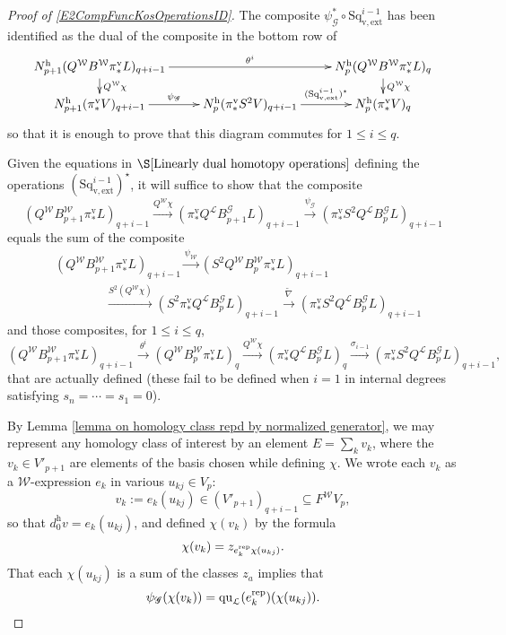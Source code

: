 \documentclass[11pt]{amsart} \renewcommand{\baselinestretch}{1.2}
\theoremstyle{plain}
\theoremstyle{definition}
\renewcommand{\to}{\longrightarrow}
\newcommand{\from}{\longleftarrow}
\newcommand{\scrG}{\mathscr{G}}
\newcommand{\calL}{\mathcal{L}}
\newcommand{\calw}{\mathcal{W}}
\newcommand{\call}{\mathcal{L}}
\newcommand{\BSW}{{\scrG}}
\newcommand{\BSWres}{B^\BSW}%
\newcommand{\quadratic}{\mathrm{qu}}
\newcommand{\vExtCohOp}{\mathrm{Sq}_\mathrm{v,ext}}
\newcommand{\uver}{^\mathrm{v}}
\newcommand{\uhor}{^\mathrm{h}}
\begin{document}
\begin{Operations in composite functor spectral sequences}
\begin{proof}[Proof of \ref{E2CompFuncKosOperationsID}]
The composite $\psi_\BSW^*\circ\vExtCohOp^{i-1}$ has been identified as the dual of the composite in the bottom row of
\[\xymatrix@R=4mm{
N\uhor_{p+1}(Q^{\calw}B^{\calw}\pi\uver_*L)_{q+i-1}\ar[rr]^-{\theta^i}
\ar[d]^-{Q^{\calw}\chi}
&%
&%
N\uhor_p(Q^{\calw}B^{\calw}\pi\uver_*L)_q\ar[d]^-{Q^{\calw}\chi}
\\%
N\uhor_{p+1}(\pi\uver_*V)_{q+i-1}\ar[r]^-{\psi_\BSW}
&%
N\uhor_{p}(\pi\uver_*S^2V)_{q+i-1}\ar[r]^-{(\vExtCohOp^{i-1})^\star}
&%
N\uhor_p(\pi\uver_*V)_q%
}\]
so that it is enough to prove that this diagram commutes for $1\leq i\leq q$.

Given the equations in $\S\ref{Linearly dual homotopy operations}$ defining the operations $(\vExtCohOp^{i-1})^\star$, it will suffice to show that the composite
\[(Q^{\calw}B^{\calw}_{p+1}\pi\uver_*L)_{q+i-1}\overset{Q^{\calw}\chi}{\to}(\pi\uver_*Q^{\calL}\BSWres_{p+1}L)_{q+i-1}\overset{\psi_\BSW}{\to}(\pi\uver_*S^2Q^{\calL}\BSWres_pL)_{q+i-1}\]
equals the sum of the composite
\[\begin{split}
&(Q^{\calw}B^{\calw}_{p+1}\pi\uver_* L)_{q+i-1}\overset{\psi_{\calw}}{\to}(S^2Q^{\calw}B^{\calw}_{p}\pi\uver_* L)_{q+i-1}\\
 &\qquad\qquad \overset{S^2(Q^{\calw}\chi)}{\to}
(S^2\pi\uver_*Q^{\call}\BSWres_pL)_{q+i-1}\overset{\widetilde{\nabla}}{\to}
(\pi\uver_*S^2Q^{\calL}\BSWres_{p}L)_{q+i-1}
\end{split}\]
and those composites, for $1\leq i \leq q$,
\[(Q^{\calw}B^{\calw}_{p+1}\pi\uver_* L)_{q+i-1}\overset{\theta^i}{\to} (Q^{\calw}B^{\calw}_{p}\pi\uver_* L)_q\overset{Q^{\calw}\chi}{\to} (\pi\uver_*Q^{\call}\BSWres_{p}L)_q\overset{\sigma_{i-1}}{\to} (\pi\uver_*S^2Q^{\calL}\BSWres_{p}L)_{q+i-1},\]
that are actually defined (these fail to be defined when $i=1$ in internal degrees satisfying $s_n=\cdots =s_1=0$). 


By Lemma \ref{lemma on homology class repd by normalized generator}, we may represent any homology class of interest by an element $E=\sum_kv_k$, where the $v_k\in V'_{p+1}$ are elements of the basis chosen while defining $\chi$. We wrote each $v_k$ as a $\calw$-expression $e_k$ in various $u_{kj}\in V_{p}$:
\[v_k:=e_{k}(u_{kj})\in (V'_{p+1})_{q+i-1}\subseteq F^{\calw}V_p,\]
so that $d\uhor_0v=e_k(u_{kj})$, and  defined  $\chi(v_k)$ by the formula 
\[\chi(v_k)=z_{e_{k}^\textup{rep}\chi(u_{kj})}.\]
That each $\chi(u_{kj})$ is a sum of the classes $z_a$ implies that 
\[\psi_\BSW(\chi(v_k))=\quadratic_{\calL}(e_{k}^\textup{rep})(\chi(u_{kj})).\]


\end{proof}
\end{Operations in composite functor spectral sequences}
\end{document}
